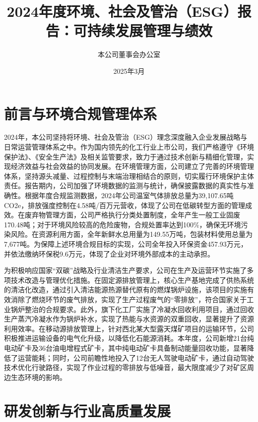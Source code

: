 \documentclass[a4paper,12pt]{article}
\title{\textbf{2024年度环境、社会及管治（ESG）报告：可持续发展管理与绩效}}
\author{本公司董事会办公室}
\date{2025年3月}
\begin{document}
\maketitle

\section{前言与环境合规管理体系}

2024年，本公司坚持将环境、社会及管治（ESG）理念深度融入企业发展战略与日常运营管理体系之中。作为国内领先的化工行业上市公司，我们严格遵守《环境保护法》、《安全生产法》及相关监管要求，致力于通过技术创新与精细化管理，实现经济效益与社会效益的协同发展。在环境管理方面，公司建立了完善的环境管理体系，坚持源头减量、过程控制与末端治理相结合的原则，切实履行环境保护主体责任。报告期内，公司加强了环境数据的监测与统计，确保披露数据的真实性与准确性。根据年度合规监测数据，2024年公司温室气体排放总量为39,107.65吨CO2e，排放强度控制在4.58吨/百万元营收，体现了公司在低碳转型方面的管理成效。在废弃物管理方面，公司严格执行分类处置制度，全年产生一般工业固废170.48吨；对于环境风险较高的危险废物，合规处置率达到100\%，确保无环境污染风险。在资源利用方面，全年新鲜水总用量为149.55万吨，包装材料使用总量为7,677吨。为保障上述环境合规目标的实现，公司全年投入环保资金457.93万元，并依法缴纳环保税9.6万元，体现了企业对环境外部成本的主动承担。

为积极响应国家“双碳”战略及行业清洁生产要求，公司在生产及运营环节实施了多项技术改造与管理优化措施。在固定源排放管理上，核心生产基地完成了供热系统的清洁化改造，通过引入清洁能源热源替代原有的燃煤锅炉设施，该项目的实施有效消除了燃烧环节的废气排放，实现了生产过程废气的“零排放”，符合国家关于工业锅炉整治的合规要求。此外，旗下化工厂实施了冷凝水回收利用项目，通过回收生产蒸汽冷凝水作为锅炉补水，实现了热能与水资源的双重回收，显著提升了资源利用效率。在移动源排放管理上，针对西北某大型露天煤矿项目的运输环节，公司积极推进运输设备的电气化升级，以降低化石能源消耗。本年度，公司新增21台纯电动矿卡及36台油电增程式矿卡，其中纯电动矿卡具备制动能量回收功能，显著降低了运营能耗；同时，公司前瞻性地投入了12台无人驾驶电动矿卡，通过自动驾驶技术优化行驶路径，实现了作业过程的零排放与低噪音，最大限度减少了对矿区周边生态环境的影响。

\section{研发创新与行业高质量发展}
\end{document}
